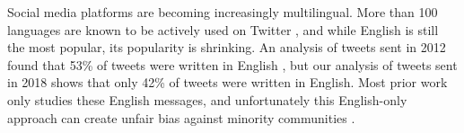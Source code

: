 \documentclass[sigconf,anonymous,review]{acmart}
\begin{document}
Social media platforms are becoming increasingly multilingual.
More than 100 languages are known to be actively used on Twitter \citep{hong2011language},
and while English is still the most popular, 
its popularity is shrinking.
An analysis of tweets sent in 2012 found that 53\% of tweets were written in English \citep{han2014text},
but our analysis of tweets sent in 2018 shows that only 42\% of tweets were written in English.
%
%
Most prior work only studies these English messages,
and unfortunately this English-only approach can create unfair bias against minority communities 
\citep[e.g.][]{blodgett2017racial,hargittai2018potential,tufekci2014big,crawford2015limits}.
\end{document}
